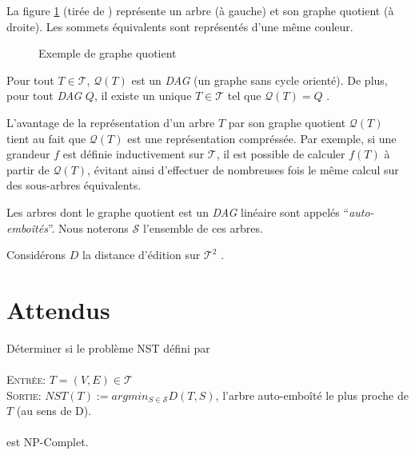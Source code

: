 La figure \ref{fig:exemple} (tirée de \cite{godin}) représente un
arbre (à gauche) et son graphe quotient (à droite). Les sommets
équivalents sont représentés d'une même couleur.

\begin {figure} [h]
  \centering
  \caption{Exemple de graphe quotient}
  \label{fig:exemple}
\end{figure}

Pour tout $T \in \mathcal{T}$, $\mathcal{Q}(T)$ est un \emph{DAG} (un
graphe sans cycle orienté). De plus, pour tout \emph{DAG} $Q$, il
existe un unique $T \in \mathcal{T}$ tel que $\mathcal{Q}(T) =
Q$ \cite{godin}.

L'avantage de la représentation d'un arbre $T$ par son graphe quotient
$\mathcal{Q}(T)$ tient au fait que $\mathcal{Q}(T)$ est une
représentation compréssée. Par exemple, si une grandeur $f$ est
définie inductivement sur $\mathcal{T}$, il est possible de calculer
$f(T)$ à partir de $\mathcal{Q}(T)$, évitant ainsi d'effectuer de
nombreuses fois le même calcul sur des sous-arbres équivalents.

Les arbres dont le graphe quotient est un \emph{DAG} linéaire sont
appelés ``\emph{auto-emboîtés}''. Nous noterons $\mathcal{S}$
l'ensemble de ces arbres.

Considérons $D$ la distance d'édition sur $\mathcal{T}^{2}$ \cite{zhang}.

\section*{Attendus}
Déterminer si le problème NST défini par \\
\\
\textsc{Entrée}: $T = (V,E) \in \mathcal{T}$ \\
\textsc{Sortie}: $NST(T) := argmin_{S \in \mathcal{S}} D(T,S)$,  l'arbre auto-emboîté
le plus proche de $T$ (au sens de D).\\
\\
est NP-Complet.